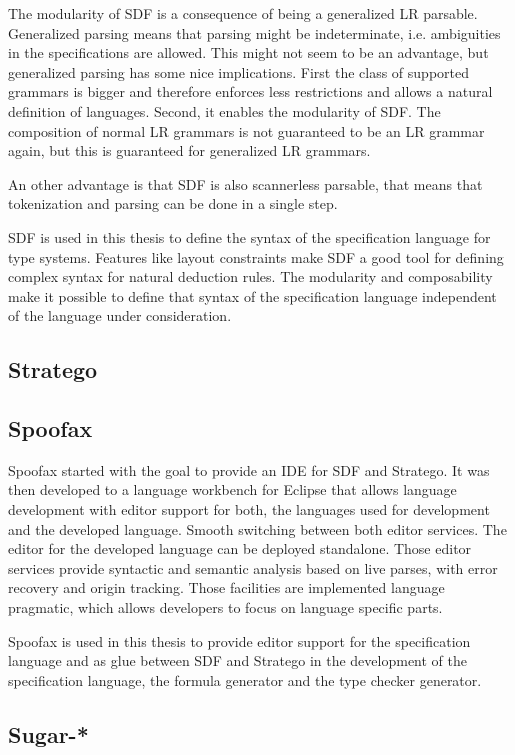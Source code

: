 \documentclass[a4paper,twoside]{report}
\begin{document}
The modularity of SDF is a consequence of being a generalized LR
parsable. Generalized parsing means that parsing might be
indeterminate, i.e. ambiguities in the specifications are
allowed. This might not seem to be an advantage, but generalized
parsing has some nice implications. First the class of supported
grammars is bigger and therefore enforces less restrictions and allows
a natural definition of languages. Second, it enables the modularity
of SDF. The composition of normal LR grammars is not guaranteed to be
an LR grammar again, but this is guaranteed for generalized LR
grammars.

An other advantage is that SDF is also scannerless parsable, that
means that tokenization and parsing can be done in a single step.


SDF is used in this thesis to define the syntax of the specification
language for type systems. Features like layout constraints make SDF a
good tool for defining complex syntax for natural deduction rules. The
modularity and composability make it possible to define that syntax of
the specification language independent of the language under
consideration.
\subsection{Stratego}
\subsection{Spoofax}
Spoofax started with the goal to provide an IDE for SDF and
Stratego. It was then developed to a language workbench for Eclipse
that allows language development with editor support for both, the
languages used for development and the developed language. Smooth
switching between both editor services. The editor for the developed
language can be deployed standalone. Those editor services provide
syntactic and semantic analysis based on live parses, with error
recovery and origin tracking. Those facilities are implemented
language pragmatic, which allows developers to focus on language
specific parts.

Spoofax is used in this thesis to provide editor support for the
specification language and as glue between SDF and Stratego in the
development of the specification language, the formula generator and
the type checker generator.
\subsection{Sugar-*}
\end{document}
